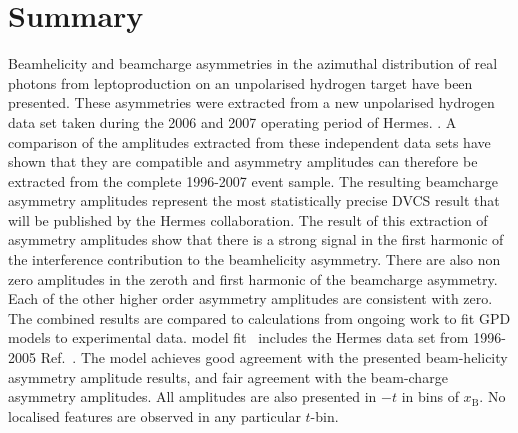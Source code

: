 \section{Summary}

Beam\blue{-}helicity and beam\blue{-}charge asymmetries in the azimuthal distribution of real photons from leptoproduction on an unpolarised hydrogen target have been presented. These asymmetries were extracted from a new unpolarised hydrogen data set taken during the 2006 and 2007 operating period of H{\sc ermes}. . A comparison of the amplitudes extracted from these independent data sets have shown that they are compatible and asymmetry amplitudes can therefore be extracted from the complete 1996-2007 event sample. The resulting beam\blue{-}charge asymmetry amplitudes represent the most statistically precise DVCS result that will be published by the H{\sc ermes} collaboration. The result of this extraction of asymmetry amplitudes show that there is a strong signal in the first harmonic of the interference contribution to the beam\blue{-}helicity asymmetry. There are also non zero amplitudes in the zeroth and first harmonic of the beam\blue{-}charge asymmetry. Each of the other higher order asymmetry amplitudes are consistent with zero. The combined results are compared to calculations from ongoing work to fit GPD models to experimental data.  model fit~\cite{Kum09} includes the H{\sc ermes} data set from 1996-2005  Ref.~\cite{Air09}. The model achieves good agreement with the presented beam-helicity asymmetry amplitude results, and fair agreement with the beam-charge asymmetry amplitudes.  All  amplitudes are also presented  in $-t$ in bins of $x_{\textrm{B}}$. No localised features are observed in any particular $t$-bin.


